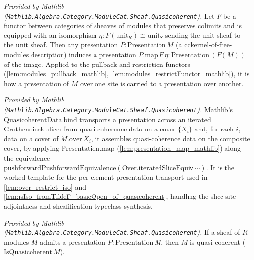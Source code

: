 \begin{lemma}
  \label{lem:presentation_map_mathlib}
  \mathlibok
  \textit{Provided by Mathlib (\texttt{Mathlib.Algebra.Category.ModuleCat.Sheaf.Quasicoherent}).}
  Let \(F\) be a functor between categories of sheaves of modules that preserves colimits and is
  equipped with an isomorphism \(\eta : F(\mathrm{unit}_R) \cong \mathrm{unit}_S\) sending the unit
  sheaf to the unit sheaf. Then any presentation \(P : \mathrm{Presentation}\,M\) (a
  cokernel-of-free-modules description) induces a presentation
  \(P.\mathrm{map}\,F\,\eta : \mathrm{Presentation}\,(F(M))\) of the image. Applied to the pullback
  and restriction functors (\cref{lem:modules_pullback_mathlib},
  \cref{lem:modules_restrictFunctor_mathlib}), it is how a presentation of \(M\) over one site is
  carried to a presentation over another.
\end{lemma}

\begin{lemma}
  \label{lem:quasicoherentData_bind_mathlib}
  \mathlibok
  \textit{Provided by Mathlib (\texttt{Mathlib.Algebra.Category.ModuleCat.Sheaf.Quasicoherent}).}
  Mathlib's \(\mathrm{QuasicoherentData.bind}\) transports a presentation across an iterated
  Grothendieck slice: from quasi-coherence data on a cover \(\{X_i\}\) and, for each \(i\), data on a
  cover of \(M.\mathrm{over}\,X_i\), it assembles quasi-coherence data on the composite cover, by
  applying \(\mathrm{Presentation.map}\) (\cref{lem:presentation_map_mathlib}) along the equivalence
  \(\mathrm{pushforwardPushforwardEquivalence}(\mathrm{Over.iteratedSliceEquiv}\,\cdots)\). It is the
  worked template for the per-element presentation transport used in \cref{lem:over_restrict_iso} and
  \cref{lem:isIso_fromTildeΓ_basicOpen_of_quasicoherent}, handling the slice-site adjointness and
  sheafification typeclass synthesis.
\end{lemma}

\begin{lemma}
  \label{lem:presentation_isQuasicoherent_mathlib}
  \mathlibok
  \textit{Provided by Mathlib
  (\texttt{Mathlib.Algebra.Category.ModuleCat.Sheaf.Quasicoherent}).}
  If a sheaf of \(R\)-modules \(M\) admits a presentation
  \(P : \mathrm{Presentation}\,M\), then \(M\) is quasi-coherent (\(\mathrm{IsQuasicoherent}\,M\)).
\end{lemma}

